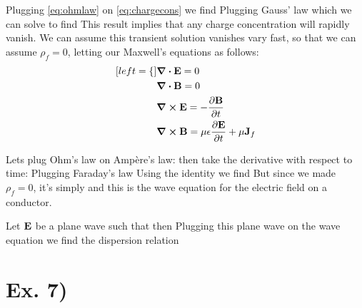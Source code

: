 \documentclass[oneside, 10pt, notitlepage]{book}
\begin{document}
Plugging \eqref{eq:ohmlaw} on \eqref{eq:chargecons} we find
Plugging Gauss' law
which we can solve to find
This result implies that any charge concentration will rapidly vanish. We can assume this transient solution vanishes vary fast, so that we can assume \(\rho_f=0\), letting our Maxwell's equations as follows:
\begin{subequations}
    \begin{align}[left = \empheqlbrace\,]
    & \div{\vb{E}} =0 \\
	& \div{\vb{B}} = 0 \\
	& \curl{\vb{E}} = -\pdv{\vb{B}}{t} \\
	& \curl{\vb{B}} = \mu \epsilon \pdv{\vb{E}}{t} + \mu \vb{J}_f
    \end{align}
\end{subequations}\par 

Lets plug Ohm's law on Ampère's law:
then take the derivative with respect to time:
Plugging Faraday's law
Using the identity
we find
But since we made \(\rho_f = 0\), it's simply
and this is the wave equation for the electric field on a conductor.\par 

Let \(\vb{E}\) be a plane wave such that
then
Plugging this plane wave on the wave equation we find the dispersion relation
\par 

\section*{Ex. 7)}
\end{document}
